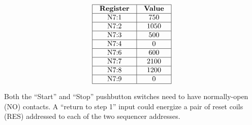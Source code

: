 






$$\vbox{\offinterlineskip
\halign{\strut
\vrule \quad\hfil # \ \hfil & 
\vrule \quad\hfil # \ \hfil \vrule \cr
\noalign{\hrule}
%
{\bf Register} & {\bf Value} \cr
%
\noalign{\hrule}
%
N7:1 & 750 \cr
%
\noalign{\hrule}
%
N7:2 & 1050 \cr
%
\noalign{\hrule}
%
N7:3 & 500 \cr
%
\noalign{\hrule}
%
N7:4 & 0 \cr
%
\noalign{\hrule}
%
N7:6 & 600 \cr
%
\noalign{\hrule}
%
N7:7 & 2100 \cr
%
\noalign{\hrule}
%
N7:8 & 1200 \cr
%
\noalign{\hrule}
%
N7:9 & 0 \cr
%
\noalign{\hrule}
} %
}$$ %








Both the ``Start'' and ``Stop'' pushbutton switches need to have normally-open (NO) contacts.  A ``return to step 1'' input could energize a pair of reset coils (RES) addressed to each of the two sequencer addresses.




